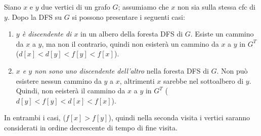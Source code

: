 \documentclass[11pt]{book}
\begin{document}
Siano $x$ e $y$ due vertici di un grafo $G$; assumiamo che $x$ non sia sulla stessa cfc di $y$. Dopo la DFS su $G$ si possono 
presentare i seguenti casi:
\begin{enumerate}
    \item \textit{$y$ è discendente di $x$} in un albero della foresta DFS di $G$. Esiste un cammino da $x$ a $y$, ma non
    il contrario, quindi non esisterà un cammino da $x$ a $y$ in $G^T$ ($d[x]<d[y]<f[y]<f[x]$).
    \item \textit{$x$ e $y$ non sono uno discendente dell'altro} nella foresta DFS di $G$. Non può esistere nessun cammino 
    da $y$ a $x$, altrimenti $x$ sarebbe nel sottoalbero di $y$. Quindi, non eeisterà il cammino da $x$ a $y$ in $G^T$ 
    ($d[y]<f[y]<d[x]<f[x]$).
\end{enumerate}
In entrambi i casi, ($f[x]>f[y]$), quindi nella seconda visita i vertici saranno considerati in ordine decrescente di tempo 
di fine visita.
\end{document}
